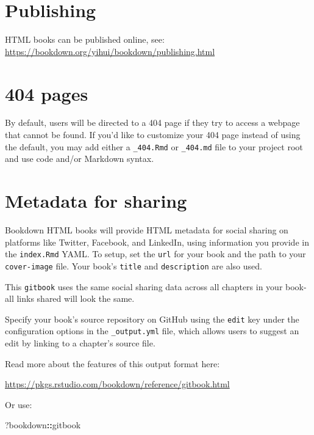 \documentclass[
  12pt,
  a4paper,
]{book}
\newenvironment{Shaded}{\begin{snugshade}}{\end{snugshade}}
\newcommand{\NormalTok}[1]{#1}
\newcommand{\SpecialCharTok}[1]{\textcolor[rgb]{0.81,0.36,0.00}{\textbf{#1}}}
\theoremstyle{definition}
\theoremstyle{definition}
\theoremstyle{definition}
\theoremstyle{definition}
\theoremstyle{remark}
\begin{document}
\section{Publishing}\label{publishing}

HTML books can be published online, see: \url{https://bookdown.org/yihui/bookdown/publishing.html}

\section{404 pages}\label{pages}

By default, users will be directed to a 404 page if they try to access a webpage that cannot be found. If you'd like to customize your 404 page instead of using the default, you may add either a \texttt{\_404.Rmd} or \texttt{\_404.md} file to your project root and use code and/or Markdown syntax.

\section{Metadata for sharing}\label{metadata-for-sharing}

Bookdown HTML books will provide HTML metadata for social sharing on platforms like Twitter, Facebook, and LinkedIn, using information you provide in the \texttt{index.Rmd} YAML. To setup, set the \texttt{url} for your book and the path to your \texttt{cover-image} file. Your book's \texttt{title} and \texttt{description} are also used.

This \texttt{gitbook} uses the same social sharing data across all chapters in your book- all links shared will look the same.

Specify your book's source repository on GitHub using the \texttt{edit} key under the configuration options in the \texttt{\_output.yml} file, which allows users to suggest an edit by linking to a chapter's source file.

Read more about the features of this output format here:

\url{https://pkgs.rstudio.com/bookdown/reference/gitbook.html}

Or use:

\begin{Shaded}
\begin{Highlighting}[]
\NormalTok{?bookdown}\SpecialCharTok{::}\NormalTok{gitbook}
\end{Highlighting}
\end{Shaded}
\end{document}
